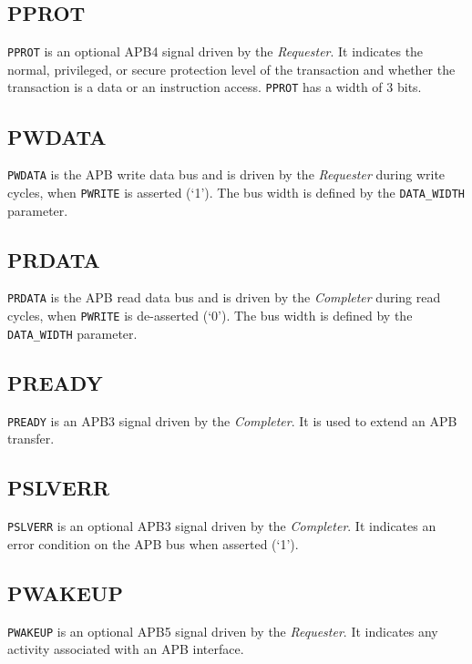 \subsection{PPROT}\label{pprot}

\texttt{PPROT} is an optional APB4 signal driven by the \emph{Requester}. It indicates the normal, privileged, or secure protection level of the transaction and whether the transaction is a data or an instruction access. \texttt{PPROT} has a width of 3 bits.

\subsection{PWDATA}\label{pwdata}

\texttt{PWDATA} is the APB write data bus and is driven by the \emph{Requester} during write cycles, when \texttt{PWRITE} is asserted (`1'). The bus width is defined by the \texttt{DATA\_WIDTH} parameter.

\subsection{PRDATA}\label{prdata}

\texttt{PRDATA} is the APB read data bus and is driven by the \emph{Completer} during read cycles, when \texttt{PWRITE} is de-asserted (`0'). The bus width is defined by the \texttt{DATA\_WIDTH} parameter.

\subsection{PREADY}\label{pready}

\texttt{PREADY} is an APB3 signal driven by the \emph{Completer}. It is used to extend an APB transfer.

\subsection{PSLVERR}\label{pslverr}

\texttt{PSLVERR} is an optional APB3 signal driven by the \emph{Completer}. It indicates an error condition on the APB bus when asserted (`1').

\subsection{PWAKEUP}\label{pwakeup}

\texttt{PWAKEUP} is an optional APB5 signal driven by the \emph{Requester}. It indicates any activity associated with an APB interface.

